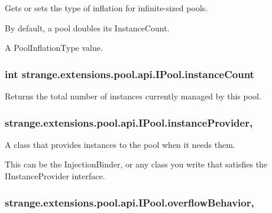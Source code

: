 Gets or sets the type of inflation for infinite-\/sized pools. 

By default, a pool doubles its Instance\-Count. 

A Pool\-Inflation\-Type value.\hypertarget{interfacestrange_1_1extensions_1_1pool_1_1api_1_1_i_pool_a64c22a4f15d41fe5f4109ac5f6d2df58}{
\subsubsection[{instance\-Count}]{\setlength{\rightskip}{0pt plus 5cm}int strange.\-extensions.\-pool.\-api.\-I\-Pool.\-instance\-Count\hspace{0.3cm}{\ttfamily [get]}}}\label{interfacestrange_1_1extensions_1_1pool_1_1api_1_1_i_pool_a64c22a4f15d41fe5f4109ac5f6d2df58}


Returns the total number of instances currently managed by this pool. 

\hypertarget{interfacestrange_1_1extensions_1_1pool_1_1api_1_1_i_pool_ada91aed79f4e553ceca25ef52427782c}{
\subsubsection[{instance\-Provider}]{ strange.\-extensions.\-pool.\-api.\-I\-Pool.\-instance\-Provider\hspace{0.3cm}{\ttfamily [get]}, {\ttfamily [set]}}}\label{interfacestrange_1_1extensions_1_1pool_1_1api_1_1_i_pool_ada91aed79f4e553ceca25ef52427782c}


A class that provides instances to the pool when it needs them. 

This can be the Injection\-Binder, or any class you write that satisfies the I\-Instance\-Provider interface. \hypertarget{interfacestrange_1_1extensions_1_1pool_1_1api_1_1_i_pool_a2883441f5785470a7d1359c99c7adf41}{
\subsubsection[{overflow\-Behavior}]{ strange.\-extensions.\-pool.\-api.\-I\-Pool.\-overflow\-Behavior\hspace{0.3cm}{\ttfamily [get]}, {\ttfamily [set]}}}\label{interfacestrange_1_1extensions_1_1pool_1_1api_1_1_i_pool_a2883441f5785470a7d1359c99c7adf41}


